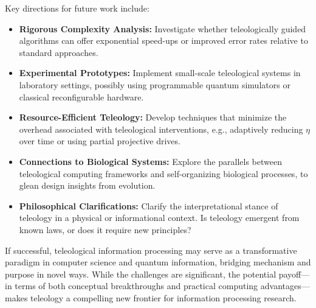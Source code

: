 \documentclass[12pt]{article}
\begin{document}
Key directions for future work include:
\begin{itemize}
    \item \textbf{Rigorous Complexity Analysis:} Investigate whether teleologically guided algorithms can offer exponential speed-ups or improved error rates relative to standard approaches.
    \item \textbf{Experimental Prototypes:} Implement small-scale teleological systems in laboratory settings, possibly using programmable quantum simulators or classical reconfigurable hardware.
    \item \textbf{Resource-Efficient Teleology:} Develop techniques that minimize the overhead associated with teleological interventions, e.g., adaptively reducing $\eta$ over time or using partial projective drives.
    \item \textbf{Connections to Biological Systems:} Explore the parallels between teleological computing frameworks and self-organizing biological processes, to glean design insights from evolution.
    \item \textbf{Philosophical Clarifications:} Clarify the interpretational stance of teleology in a physical or informational context. Is teleology emergent from known laws, or does it require new principles?
\end{itemize}

If successful, teleological information processing may serve as a transformative paradigm in computer science and quantum information, bridging mechanism and purpose in novel ways. While the challenges are significant, the potential payoff---in terms of both conceptual breakthroughs and practical computing advantages---makes teleology a compelling new frontier for information processing research.
\end{document}
